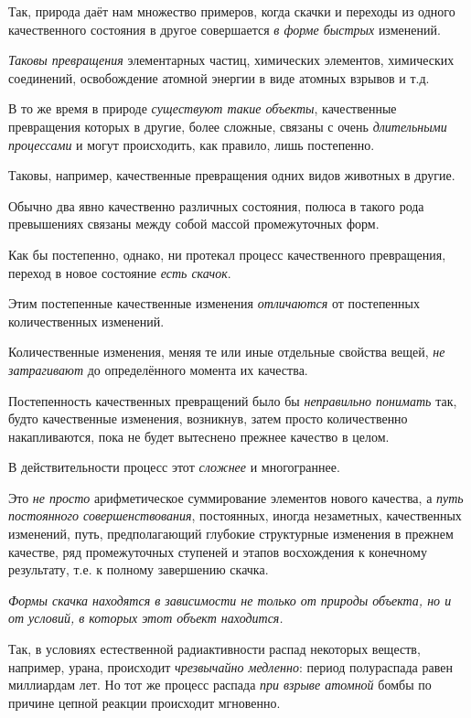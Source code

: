 \documentclass[a4paper,14pt,russian]{extreport}
\begin{document}
Так, природа даёт нам множество примеров, когда скачки и переходы из одного качественного состояния в другое совершается \emph{в форме быстрых} изменений.

\emph{Таковы превращения} элементарных частиц, химических элементов, химических соединений, освобождение атомной энергии в виде атомных взрывов и т.д.

В то же время в природе \emph{существуют такие объекты}, качественные превращения которых в другие, более сложные, связаны с очень \emph{длительными процессами} и могут происходить, как правило, лишь постепенно.

Таковы, например, качественные превращения одних видов животных в другие.

Обычно два явно качественно различных состояния, полюса в такого рода превышениях связаны между собой массой промежуточных форм.

Как бы постепенно, однако, ни протекал процесс качественного превращения, переход в новое состояние \emph{есть скачок}.

Этим постепенные качественные изменения \emph{отличаются} от постепенных количественных изменений.

Количественные изменения, меняя те или иные отдельные свойства вещей, \emph{не затрагивают} до определённого момента их качества.

Постепенность качественных превращений было бы \emph{неправильно понимать} так, будто качественные изменения, возникнув, затем просто количественно накапливаются, пока не будет вытеснено прежнее качество в целом.

В действительности процесс этот \emph{сложнее} и многограннее.

Это \emph{не просто} арифметическое суммирование элементов нового качества, а \emph{путь постоянного совершенствования}, постоянных, иногда незаметных, качественных изменений, путь, предполагающий глубокие структурные изменения в прежнем качестве, ряд промежуточных ступеней и этапов восхождения к конечному результату, т.е. к полному завершению скачка.

\emph{Формы скачка находятся в зависимости не только от природы объекта, но и от условий, в которых этот объект находится.}

Так, в условиях естественной радиактивности распад некоторых веществ, например, урана, происходит \emph{чрезвычайно медленно}: период полураспада равен миллиардам лет. Но тот же процесс распада \emph{при взрыве атомной} бомбы по причине цепной реакции происходит мгновенно.
\end{document}
